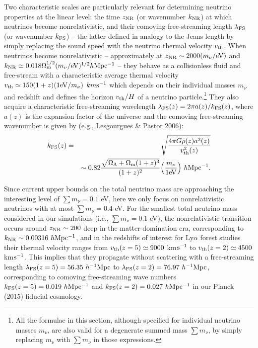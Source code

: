 \documentclass{emulateapj}
\begin{document}
Two characteristic scales are particularly relevant for determining neutrino properties at the linear level: 
the time $z_{\rm NR}$ (or wavenumber $k_{\rm NR}$) at which neutrinos become nonrelativistic, and 
their comoving free-streaming length $\lambda_{\rm FS}$ (or wavenumber $k_{\rm FS}$) -- the latter defined in analogy to the Jeans 
length by simply replacing the sound speed with the neutrino thermal velocity $v_{\rm th}$.
When neutrinos become nonrelativistic -- approximately
at $z_{\rm NR} \sim 2000 (m_{\nu}/{\rm eV})$ and $k_{\rm NR} \simeq 0.018 \Omega_{\rm m}^{1/2} (m_{\nu}/{\rm eV})^{1/2} h {\rm Mpc^{-1}}$ 
-- they behave as a collisionless fluid and free-stream with a characteristic  average thermal
velocity $v_{\rm th} \simeq 150(1+z) (1{\rm eV}/m_{\nu})$ $km{\rm s^{-1}}$ which depends on their individual masses $m_{\nu}$ and redshift 
and defines the horizon $v_{\rm th}/H$ of a neutrino particle.\footnote{All the formulae in this section, although specified for individual neutrino 
masses $m_{\nu}$, are also valid for a degenerate summed mass $\sum m_{\nu}$, by simply replacing 
$m_{\nu}$ with $\sum m_{\nu}$ in those expressions.}
They also acquire a   
characteristic free-streaming wavelength $\lambda_{\rm FS} (z) = 2 \pi a(z) / k_{\rm FS}(z)$, where $a(z)$ is the expansion factor of the universe and
 the comoving free-streaming wavenumber is given by (e.g., Lesgourgues \& Pastor 2006):
\begin{eqnarray}
k_{\rm FS}(z) &=& \sqrt{ {4 \pi G \bar{\rho}(z) a^2(z)   \over v^2_{\rm th} (z) } } \\ \nonumber
&& \sim 0.82 {\sqrt{\Omega_{\Lambda} +\Omega_{\rm m} (1+z)^3 } \over  (1+z)^2} \Big ( {m_{\nu} \over 1{\rm eV}} \Big )~h {\rm Mpc^{-1}}.
\end{eqnarray}

Since current upper bounds on the total neutrino mass are approaching the interesting level of $\sum m_{\nu}=0.1$ eV,  
here we only focus on nonrelativistic neutrinos with at most $\sum m_{\nu}=0.4$ eV. For 
the smallest total neutrino mass considered in our simulations (i.e., $\sum m_{\nu} =0.1$ eV), 
the nonrelativistic transition occurs around $z_{\rm NR} \sim 200$ deep in the matter-domination era, corresponding to $k_{\rm NR} \sim 0.00316 ~h {\rm Mpc^{-1}}$, 
 and in the redshifts of interest for Ly$\alpha$ forest studies their thermal velocity ranges from $v_{\rm th} (z=5) \simeq 9000$ km${\rm s^{-1}}$ 
to  $v_{\rm th} (z=2) \simeq 4500$ km${\rm s^{-1}}$. This implies  that 
they propagate without scattering 
with a free-streaming length $\lambda_{\rm FS} (z=5) =56.35 ~h^{-1}{\rm Mpc}$  to
$\lambda_{\rm FS} (z=2)=  76.97 ~h^{-1}{\rm Mpc}$, 
corresponding to comoving free-streaming wave numbers $k_{\rm FS}(z=5)=0.019~ h {\rm Mpc^{-1}}$ and $k_{\rm FS}(z=2)=0.027~h{\rm Mpc^{-1}}$ 
in our Planck (2015) fiducial cosmology. 
\end{document}
